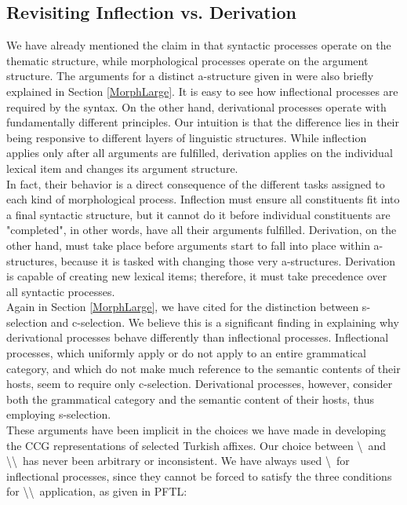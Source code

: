 \documentclass[11pt]{article} %
\begin{document}
\subsection{Revisiting Inflection vs. Derivation}

\label{InflVsDerv}

We have already mentioned the claim in \citet{Sezer1991} that syntactic processes operate on the thematic structure, while morphological processes operate on the argument structure. The arguments for a distinct a-structure given in \citet{Grimshaw1990} were also briefly explained in Section \ref{MorphLarge}. It is easy to see how inflectional processes are required by the syntax. On the other hand, derivational processes operate with fundamentally different principles. Our intuition is that the difference lies in their being responsive to different layers of linguistic structures. While inflection applies only after all arguments are fulfilled, derivation applies on the individual lexical item and changes its argument structure. \\

In fact, their behavior is a direct consequence of the different tasks assigned to each kind of morphological process. Inflection must ensure all constituents fit into a final syntactic structure, but it cannot do it before individual constituents are "completed", in other words, have all their arguments fulfilled. Derivation, on the other hand, must take place before arguments start to fall into place within a-structures, because it is tasked with changing those very a-structures. Derivation is capable of creating new lexical items; therefore, it must take precedence over all syntactic processes. \\

Again in Section \ref{MorphLarge}, we have cited \citet{Sezer1991} for the distinction between s-selection and c-selection. We believe this is a significant finding in explaining why derivational processes behave differently than inflectional processes. Inflectional processes, which uniformly apply or do not apply to an entire grammatical category, and which do not make much reference to the semantic contents of their hosts, seem to require only c-selection. Derivational processes, however, consider both the grammatical category and the semantic content of their hosts, thus employing s-selection.  \\

These arguments have been implicit in the choices we have made in developing the CCG representations of selected Turkish affixes. Our choice between \textbackslash\  and \textbackslash \textbackslash\  has never been arbitrary or inconsistent. We have always used \textbackslash\  for inflectional processes, since they cannot be forced to satisfy the three conditions for \textbackslash \textbackslash\  application, as given in PFTL: 
\end{document}
